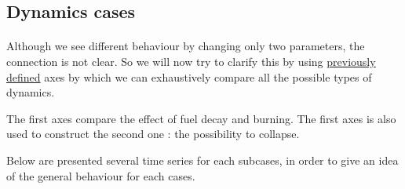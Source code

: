\documentclass{article}
\begin{document}
\newpage

\subsection{Dynamics cases}



\paragraph{}
Although we see different behaviour by changing only two parameters, the connection is not clear. So we will now try to clarify this by using \hyperref[axes_definition]{previously defined} axes by which we can exhaustively compare all the possible types of dynamics.
    
The first axes compare the effect of fuel decay and burning. The first axes is also used to construct the second one : the possibility to collapse.

Below are presented several time series for each subcases, in order to give an idea of the general behaviour for each cases.
\end{document}

